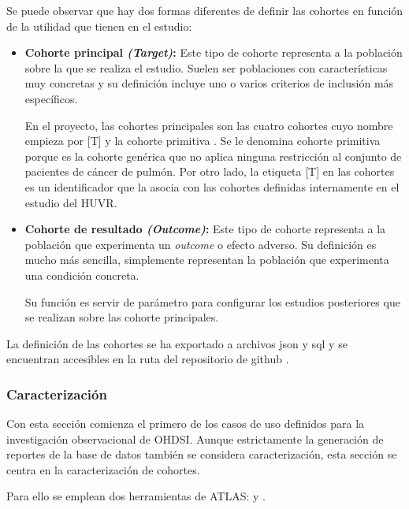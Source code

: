 Se puede observar que hay dos formas diferentes de definir las cohortes en función de la utilidad que tienen en el estudio:

\begin{itemize}

    \item \textbf{Cohorte principal \textit{(Target)}:} Este tipo de cohorte representa a la población sobre la que se realiza el estudio. Suelen ser poblaciones con características muy concretas y su definición incluye uno o varios criterios de inclusión más específicos.

    En el proyecto, las cohortes principales son las cuatro cohortes cuyo nombre empieza por [T] y la cohorte primitiva . Se le denomina cohorte primitiva porque es la cohorte genérica que no aplica ninguna restricción al conjunto de pacientes de cáncer de pulmón. Por otro lado, la etiqueta [T] en las cohortes es un identificador que la asocia con las cohortes definidas internamente en el estudio del HUVR. 

    \item \textbf{Cohorte de resultado \textit{(Outcome)}:} Este tipo de cohorte representa a la población que experimenta un \textit{outcome} o efecto adverso. Su definición es mucho más sencilla, simplemente representan la población que experimenta una condición concreta.
    
    Su función es servir de parámetro para configurar los estudios posteriores que se realizan sobre las cohorte principales.
 
\end{itemize}

La definición de las cohortes se ha exportado a archivos json y sql y se encuentran accesibles en la ruta del repositorio de github .

\subsubsection{Caracterización}

Con esta sección comienza el primero de los casos de uso definidos para la investigación observacional de OHDSI. Aunque estrictamente la generación de reportes de la base de datos también se considera caracterización, esta sección se centra en la caracterización de cohortes.

Para ello se emplean dos herramientas de ATLAS:  y .

